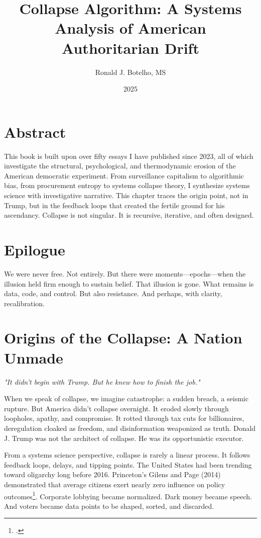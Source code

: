 \documentclass[12pt,openany]{book}
\title{Collapse Algorithm: A Systems Analysis of American Authoritarian Drift}
\author{Ronald J. Botelho, MS}
\date{2025}
\begin{document}
\maketitle

\chapter*{Abstract}
This book is built upon over fifty essays I have published since 2023, all of which investigate the structural, psychological, and thermodynamic erosion of the American democratic experiment. From surveillance capitalism to algorithmic bias, from procurement entropy to systems collapse theory, I synthesize systems science with investigative narrative. This chapter traces the origin point, not in Trump, but in the feedback loops that created the fertile ground for his ascendancy. Collapse is not singular. It is recursive, iterative, and often designed.

\chapter*{Epilogue}
We were never free. Not entirely. But there were moments—epochs—when the illusion held firm enough to sustain belief. That illusion is gone. What remains is data, code, and control. But also resistance. And perhaps, with clarity, recalibration.

\chapter{Origins of the Collapse: A Nation Unmade}

\textit{"It didn't begin with Trump. But he knew how to finish the job."}

When we speak of collapse, we imagine catastrophe: a sudden breach, a seismic rupture. But America didn't collapse overnight. It eroded slowly through loopholes, apathy, and compromise. It rotted through tax cuts for billionaires, deregulation cloaked as freedom, and disinformation weaponized as truth. Donald J. Trump was not the architect of collapse. He was its opportunistic executor.

From a systems science perspective, collapse is rarely a linear process. It follows feedback loops, delays, and tipping points. The United States had been trending toward oligarchy long before 2016. Princeton's Gilens and Page (2014) demonstrated that average citizens exert nearly zero influence on policy outcomes\footcite{gilens2014testing}. Corporate lobbying became normalized. Dark money became speech. And voters became data points to be shaped, sorted, and discarded.
\end{document}
